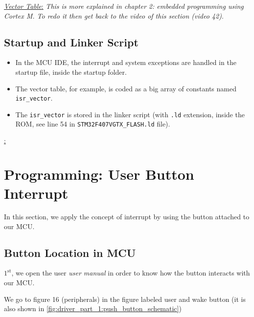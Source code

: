  \underline{\textit{Vector Table}:} \textit{This is more explained in chapter 2: embedded programming using Cortex M. To redo it then get back to the video of this section (video 42)}. 

\subsection{Startup and Linker Script}

\begin{itemize}

\item In the MCU IDE, the interrupt and system exceptions are handled in the startup file, inside the startup folder.


\item The vector table, for example, is coded as a big array of constants named \verb|isr_vector|.

\item The \verb|isr_vector| is stored in the linker script (with \verb|.ld| extension, inside the ROM, see line 54 in \verb|STM32F407VGTX_FLASH.ld| file).
 
\end{itemize}

 \underline{:} 

\newpage
\section{Programming: User Button Interrupt}

In this section, we apply the concept of interrupt by using the button attached to our MCU.

\subsection{Button Location in MCU}

$\mathrm{1}^\mathrm{st}$, we open the user \textit{user manual} in order to know how the button interacts with our MCU.

We go to figure 16 (peripherals) in the figure labeled user and wake button (it is also shown in \autoref{fig:driver_part_1:push_button_schematic})

